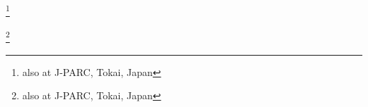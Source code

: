 \author{K.\,Abe}\INSTBJ
\author{J.\,Adam}\INSTFJ
\author{H.\,Aihara}\INSTCH\INSTHA
\author{T.\,Akiri}\INSTFH
\author{C.\,Andreopoulos}\INSTEH
\author{S.\,Aoki}\INSTCC
\author{A.\,Ariga}\INSTEE
\author{T.\,Ariga}\INSTEE
\author{S.\,Assylbekov}\INSTFG
\author{D.\,Autiero}\INSTJ
\author{M.\,Barbi}\INSTE
\author{G.J.\,Barker}\INSTFD
\author{G.\,Barr}\INSTGG
\author{M.\,Bass}\INSTFG
\author{M.\,Batkiewicz}\INSTDG
\author{F.\,Bay}\INSTEF
\author{S.W.\,Bentham}\INSTEJ
\author{V.\,Berardi}\INSTGF
\author{B.E.\,Berger}\INSTFG\INSTHA
\author{S.\,Berkman}\INSTD
\author{I.\,Bertram}\INSTEJ
\author{S.\,Bhadra}\INSTH
\author{F.d.M.\,Blaszczyk}\INSTFI
\author{A.\,Blondel}\INSTEG
\author{C.\,Bojechko}\INSTG
\author{S.\,Bordoni }\INSTED
\author{S.B.\,Boyd}\INSTFD
\author{D.\,Brailsford}\INSTEI
\author{A.\,Bravar}\INSTEG
\author{C.\,Bronner}\INSTHA
\author{N.\,Buchanan}\INSTFG
\author{R.G.\,Calland}\INSTFC
\author{J.\,Caravaca Rodr\'iguez}\INSTED
\author{S.L.\,Cartwright}\INSTFB
\author{R.\,Castillo}\INSTED
\author{M.G.\,Catanesi}\INSTGF
\author{A.\,Cervera}\INSTEC
\author{D.\,Cherdack}\INSTFG
\author{G.\,Christodoulou}\INSTFC
\author{A.\,Clifton}\INSTFG
\author{J.\,Coleman}\INSTFC
\author{S.J.\,Coleman}\INSTGB
\author{G.\,Collazuol}\INSTBF
\author{K.\,Connolly}\INSTGE
\author{L.\,Cremonesi}\INSTFA
\author{A.\,Dabrowska}\INSTDG
\author{I.\,Danko}\INSTGC
\author{R.\,Das}\INSTFG
\author{S.\,Davis}\INSTGE
\author{P.\,de Perio}\INSTF
\author{G.\,De Rosa}\INSTBE
\author{T.\,Dealtry}\INSTEH\INSTGG
\author{S.R.\,Dennis}\INSTFD\INSTEH
\author{C.\,Densham}\INSTEH
\author{D.\,Dewhurst}\INSTGG
\author{F.\,Di Lodovico}\INSTFA
\author{S.\,Di Luise}\INSTEF
\author{O.\,Drapier}\INSTBA
\author{T.\,Duboyski}\INSTFA
\author{K.\,Duffy}\INSTGG
\author{F.\,Dufour}\INSTEG
\author{J.\,Dumarchez}\INSTBB
\author{S.\,Dytman}\INSTGC
\author{M.\,Dziewiecki}\INSTDH
\author{S.\,Emery-Schrenk}\INSTI
\author{A.\,Ereditato}\INSTEE
\author{L.\,Escudero}\INSTEC
\author{A.J.\,Finch}\INSTEJ
\author{G.A.\,Fiorentini Aguirre}\INSTH
\author{M.\,Friend}\thanks{also at J-PARC, Tokai, Japan}\INSTCB
\author{Y.\,Fujii}\thanks{also at J-PARC, Tokai, Japan}\INSTCB
\author{Y.\,Fukuda}\INSTCE
\author{A.P.\,Furmanski}\INSTFD
\author{V.\,Galymov}\INSTJ
\author{A.\,Gaudin}\INSTG
\author{S.\,Giffin}\INSTE
\author{C.\,Giganti}\INSTBB
\author{K.\,Gilje}\INSTFJ
\author{D.\,Goeldi}\INSTEE
\author{T.\,Golan}\INSTEA
\author{J.J.\,Gomez-Cadenas}\INSTEC
\author{M.\,Gonin}\INSTBA
\author{N.\,Grant}\INSTEJ
\author{D.\,Gudin}\INSTEB
\author{D.R.\,Hadley}\INSTFD
\author{L.\,Haegel}\INSTEG
\author{A.\,Haesler}\INSTEG
\author{M.D.\,Haigh}\INSTFD
